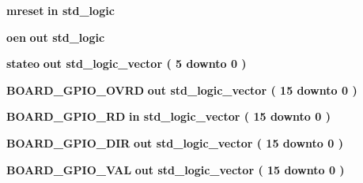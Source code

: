 \begin{DoxyCompactItemize}
{\bf mreset}  {\bfseries {\bfseries \textcolor{keywordflow}{in}\textcolor{vhdlchar}{ }}} {\bfseries \textcolor{comment}{std\+\_\+logic}\textcolor{vhdlchar}{ }} 
\item 
{\bf oen}  {\bfseries {\bfseries \textcolor{keywordflow}{out}\textcolor{vhdlchar}{ }}} {\bfseries \textcolor{comment}{std\+\_\+logic}\textcolor{vhdlchar}{ }} 
\item 
{\bf stateo}  {\bfseries {\bfseries \textcolor{keywordflow}{out}\textcolor{vhdlchar}{ }}} {\bfseries \textcolor{comment}{std\+\_\+logic\+\_\+vector}\textcolor{vhdlchar}{ }\textcolor{vhdlchar}{(}\textcolor{vhdlchar}{ }\textcolor{vhdlchar}{ } \textcolor{vhdldigit}{5} \textcolor{vhdlchar}{ }\textcolor{keywordflow}{downto}\textcolor{vhdlchar}{ }\textcolor{vhdlchar}{ } \textcolor{vhdldigit}{0} \textcolor{vhdlchar}{ }\textcolor{vhdlchar}{)}\textcolor{vhdlchar}{ }} 
\item 
{\bf B\+O\+A\+R\+D\+\_\+\+G\+P\+I\+O\+\_\+\+O\+V\+RD}  {\bfseries {\bfseries \textcolor{keywordflow}{out}\textcolor{vhdlchar}{ }}} {\bfseries \textcolor{comment}{std\+\_\+logic\+\_\+vector}\textcolor{vhdlchar}{ }\textcolor{vhdlchar}{(}\textcolor{vhdlchar}{ }\textcolor{vhdlchar}{ } \textcolor{vhdldigit}{15} \textcolor{vhdlchar}{ }\textcolor{keywordflow}{downto}\textcolor{vhdlchar}{ }\textcolor{vhdlchar}{ } \textcolor{vhdldigit}{0} \textcolor{vhdlchar}{ }\textcolor{vhdlchar}{)}\textcolor{vhdlchar}{ }} 
\item 
{\bf B\+O\+A\+R\+D\+\_\+\+G\+P\+I\+O\+\_\+\+RD}  {\bfseries {\bfseries \textcolor{keywordflow}{in}\textcolor{vhdlchar}{ }}} {\bfseries \textcolor{comment}{std\+\_\+logic\+\_\+vector}\textcolor{vhdlchar}{ }\textcolor{vhdlchar}{(}\textcolor{vhdlchar}{ }\textcolor{vhdlchar}{ } \textcolor{vhdldigit}{15} \textcolor{vhdlchar}{ }\textcolor{keywordflow}{downto}\textcolor{vhdlchar}{ }\textcolor{vhdlchar}{ } \textcolor{vhdldigit}{0} \textcolor{vhdlchar}{ }\textcolor{vhdlchar}{)}\textcolor{vhdlchar}{ }} 
\item 
{\bf B\+O\+A\+R\+D\+\_\+\+G\+P\+I\+O\+\_\+\+D\+IR}  {\bfseries {\bfseries \textcolor{keywordflow}{out}\textcolor{vhdlchar}{ }}} {\bfseries \textcolor{comment}{std\+\_\+logic\+\_\+vector}\textcolor{vhdlchar}{ }\textcolor{vhdlchar}{(}\textcolor{vhdlchar}{ }\textcolor{vhdlchar}{ } \textcolor{vhdldigit}{15} \textcolor{vhdlchar}{ }\textcolor{keywordflow}{downto}\textcolor{vhdlchar}{ }\textcolor{vhdlchar}{ } \textcolor{vhdldigit}{0} \textcolor{vhdlchar}{ }\textcolor{vhdlchar}{)}\textcolor{vhdlchar}{ }} 
\item 
{\bf B\+O\+A\+R\+D\+\_\+\+G\+P\+I\+O\+\_\+\+V\+AL}  {\bfseries {\bfseries \textcolor{keywordflow}{out}\textcolor{vhdlchar}{ }}} {\bfseries \textcolor{comment}{std\+\_\+logic\+\_\+vector}\textcolor{vhdlchar}{ }\textcolor{vhdlchar}{(}\textcolor{vhdlchar}{ }\textcolor{vhdlchar}{ } \textcolor{vhdldigit}{15} \textcolor{vhdlchar}{ }\textcolor{keywordflow}{downto}\textcolor{vhdlchar}{ }\textcolor{vhdlchar}{ } \textcolor{vhdldigit}{0} \textcolor{vhdlchar}{ }\textcolor{vhdlchar}{)}\textcolor{vhdlchar}{ }} 

\end{DoxyCompactItemize}
